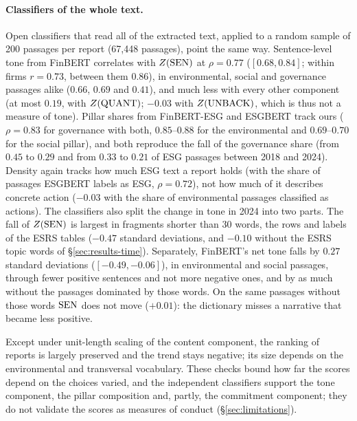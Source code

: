 \paragraph{Classifiers of the whole text.} Open classifiers that read all of the
extracted text, applied to a random sample of 200 passages per report (67{,}448
passages), point the same way. Sentence-level tone from FinBERT
\citep{huang2023finbert} correlates with $Z(\mathrm{SEN})$ at $\rho = 0.77$
($[0.68, 0.84]$; within firms $r = 0.73$, between them $0.86$), in environmental,
social and governance passages alike ($0.66$, $0.69$ and $0.41$), and much less
with every other component (at most $0.19$, with $Z(\mathrm{QUANT})$; $-0.03$ with
$Z(\mathrm{UNBACK})$, which is thus not a measure of tone). Pillar shares from FinBERT-ESG
and ESGBERT \citep{schimanski2024esgbert} track ours ($\rho = 0.83$ for
governance with both, $0.85$--$0.88$ for the environmental and $0.69$--$0.70$
for the social pillar), and both reproduce the fall of the governance share
(from $0.45$ to $0.29$ and from $0.33$ to $0.21$ of ESG passages between 2018
and 2024). Density again tracks how much ESG text a report holds (with the
share of passages ESGBERT labels as ESG, $\rho = 0.72$), not how much of it
describes concrete action ($-0.03$ with the share of environmental passages
classified as actions). The classifiers also split the change in tone in 2024
into two parts. The fall of $Z(\mathrm{SEN})$ is largest in fragments shorter than 30
words, the rows and labels of the ESRS tables ($-0.47$ standard deviations, and
$-0.10$ without the ESRS topic words of \S\ref{sec:results-time}). Separately,
FinBERT's net tone falls by $0.27$ standard deviations ($[-0.49, -0.06]$), in
environmental and social passages, through fewer positive sentences and not more
negative ones, and by as much without the passages dominated by those words. On
the same passages without those words $\mathrm{SEN}$ does not move ($+0.01$): the
dictionary misses a narrative that became less positive.

Except under unit-length scaling of the content component, the ranking of reports is
largely preserved and the trend stays negative; its size depends on the
environmental and transversal vocabulary. These checks bound how far
the scores depend on the choices varied, and the independent classifiers
support the tone component, the pillar composition and, partly, the commitment
component; they do not validate
the scores as measures of conduct (\S\ref{sec:limitations}).
